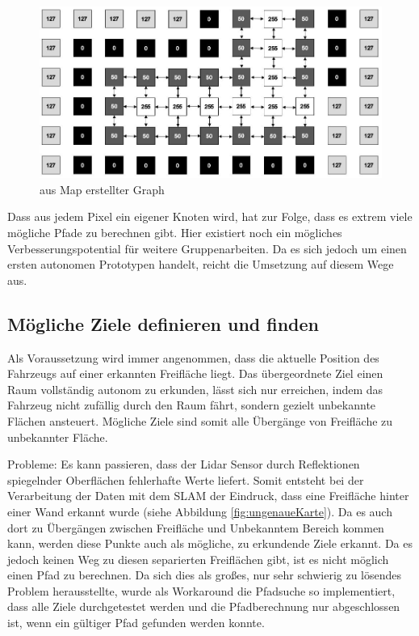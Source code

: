 \vspace{0.5cm}
\begin{figure}[h]
\begin{center}
\includegraphics[width=15cm]{images/chapter5/GraphKnoten.JPG}
\caption{aus Map erstellter Graph}
\label{Map_aus_Graph}
\end{center}
\end{figure}


Dass aus jedem Pixel ein eigener Knoten wird, hat zur Folge, dass es extrem viele mögliche Pfade zu berechnen gibt. Hier existiert noch ein mögliches Verbesserungspotential für weitere Gruppenarbeiten. Da es sich jedoch um einen ersten autonomen Prototypen handelt, reicht die Umsetzung auf diesem Wege aus.




\subsection{Mögliche Ziele definieren und finden}
\label{sec:ziele}

Als Voraussetzung wird immer angenommen, dass die aktuelle Position des Fahrzeugs auf einer erkannten Freifläche liegt. Das übergeordnete Ziel einen Raum vollständig autonom zu erkunden, lässt sich nur erreichen, indem das Fahrzeug nicht zufällig durch den Raum fährt, sondern gezielt unbekannte Flächen ansteuert. Mögliche Ziele sind somit alle Übergänge von Freifläche zu unbekannter Fläche. 

Probleme:
Es kann passieren, dass der Lidar Sensor durch Reflektionen spiegelnder Oberflächen fehlerhafte Werte liefert. Somit entsteht bei der Verarbeitung der Daten mit dem SLAM der Eindruck, dass eine Freifläche hinter einer Wand erkannt wurde (siehe Abbildung \ref{fig:ungenaueKarte}). Da es auch dort zu Übergängen zwischen Freifläche und Unbekanntem Bereich kommen kann, werden diese Punkte auch als mögliche, zu erkundende Ziele erkannt. Da es jedoch keinen Weg zu diesen separierten Freiflächen gibt, ist es nicht möglich einen Pfad zu berechnen. Da sich dies als großes, nur sehr schwierig zu lösendes Problem herausstellte, wurde als Workaround die Pfadsuche so implementiert, dass alle Ziele durchgetestet werden und die Pfadberechnung nur abgeschlossen ist, wenn ein gültiger Pfad gefunden werden konnte.


